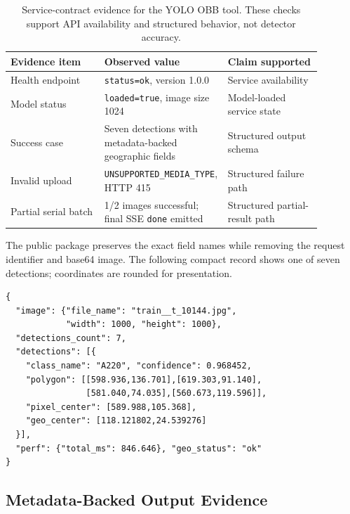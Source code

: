 \begin{table}[htbp]
\centering
\renewcommand{\arraystretch}{1.16}
\setlength{\tabcolsep}{4pt}
\caption{Service-contract evidence for the YOLO OBB tool. These checks support API availability and structured behavior, not detector accuracy.}
\label{tab:service_evidence}
\begin{tabular}{p{0.30\linewidth}p{0.28\linewidth}p{0.30\linewidth}}
\toprule
\rowcolor{gray!12}
\textbf{Evidence item} & \textbf{Observed value} & \textbf{Claim supported} \\
\midrule
Health endpoint & \texttt{status=ok}, version 1.0.0 & Service availability \\
\rowcolor{graybg}
Model status & \texttt{loaded=true}, image size 1024 & Model-loaded service state \\
Success case & Seven detections with metadata-backed geographic fields & Structured output schema \\
\rowcolor{graybg}
Invalid upload & \texttt{UNSUPPORTED\_\allowbreak MEDIA\_\allowbreak TYPE}, HTTP 415 & Structured failure path \\
Partial serial batch & 1/2 images successful; final SSE \texttt{done} emitted & Structured partial-result path \\
\bottomrule
\end{tabular}
\end{table}

The public package preserves the exact field names while removing the request identifier and base64 image. The following compact record shows one of seven detections; coordinates are rounded for presentation.

\begin{small}
\begin{verbatim}
{
  "image": {"file_name": "train__t_10144.jpg",
            "width": 1000, "height": 1000},
  "detections_count": 7,
  "detections": [{
    "class_name": "A220", "confidence": 0.968452,
    "polygon": [[598.936,136.701],[619.303,91.140],
                [581.040,74.035],[560.673,119.596]],
    "pixel_center": [589.988,105.368],
    "geo_center": [118.121802,24.539276]
  }],
  "perf": {"total_ms": 846.646}, "geo_status": "ok"
}
\end{verbatim}
\end{small}

\subsection{Metadata-Backed Output Evidence}

